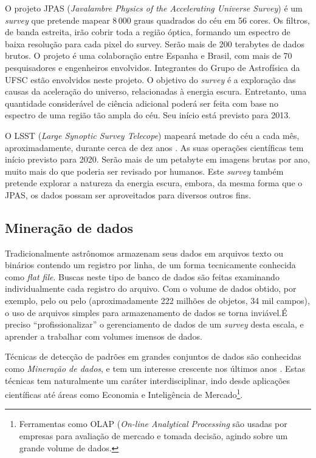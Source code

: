 O projeto JPAS ({\em Javalambre Physics of the Accelerating Universe Survey}) é
um {\em survey} que pretende mapear $8\,000$ graus quadrados do céu em 56
cores\citep{Benitez2009}. Os filtros, de banda estreita, irão cobrir toda a
região óptica, formando um espectro de baixa resolução para cada pixel do
survey. Serão mais de 200 terabytes de dados brutos\citneed. O projeto é uma
colaboração entre Espanha e Brasil, com mais de 70 pesquisadores e engenheiros
envolvidos. Integrantes do Grupo de Astrofísica da UFSC estão envolvidos neste
projeto\citneed. O objetivo do {\em survey} é a exploração das causas da
aceleração do universo, relacionadas à energia escura. Entretanto, uma
quantidade considerável de ciência adicional poderá ser feita com base no
espectro de uma região tão ampla do céu. Seu início está previsto para 2013.

O LSST ({\em Large Synoptic Survey Telecope}) mapeará metade do céu a cada mês,
aproximadamente, durante cerca de dez anos \citep{Ivezic2008}. As suas operações
científicas tem início previsto para 2020. Serão mais de um petabyte em imagens
brutas por ano, muito mais do que poderia ser revisado por humanos. Este {\em
survey} também pretende explorar a natureza da energia escura, embora, da mesma
forma que o JPAS, os dados possam ser aproveitados para diversos outros fins.

\subsection{Mineração de dados}

Tradicionalmente astrônomos armazenam seus dados em arquivos texto ou binários
contendo um registro por linha, de um forma tecnicamente conhecida como {\em
flat file}. Buscas neste tipo de banco de dados são feitas examinando
individualmente cada registro do arquivo. Com o volume de dados obtido, por
exemplo, pelo \SDSS ou pelo \galex (aproximadamente 222 milhões de objetos, 34
mil campos), o uso de arquivos simples para armazenamento de dados se torna
inviável.\citneed É preciso ``profissionalizar'' o gerenciamento de dados de um
{\em survey} desta escala, e aprender a trabalhar com volumes imensos de dados.

Técnicas de detecção de padrões em grandes conjuntos de dados são conhecidas
como {\em Mineração de dados}, e tem um interesse crescente nos últimos anos
\citep{SIGKDD2011}. Estas técnicas tem naturalmente um caráter interdisciplinar,
indo desde aplicações científicas até áreas como Economia \citep{Spanos2000} e
Inteligência de Mercado\footnote{Ferramentas como OLAP ({\em On-line Analytical
Processing} são usadas por empresas para avaliação de mercado e tomada decisão,
agindo sobre um grande volume de dados.}.

